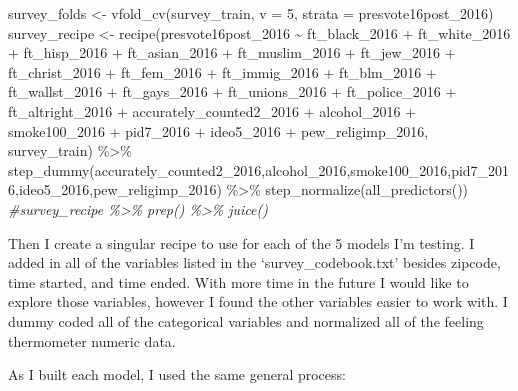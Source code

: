 \documentclass[
]{article}
\newenvironment{Shaded}{\begin{snugshade}}{\end{snugshade}}
\newcommand{\AttributeTok}[1]{\textcolor[rgb]{0.77,0.63,0.00}{#1}}
\newcommand{\CommentTok}[1]{\textcolor[rgb]{0.56,0.35,0.01}{\textit{#1}}}
\newcommand{\DecValTok}[1]{\textcolor[rgb]{0.00,0.00,0.81}{#1}}
\newcommand{\FunctionTok}[1]{\textcolor[rgb]{0.00,0.00,0.00}{#1}}
\newcommand{\NormalTok}[1]{#1}
\newcommand{\OtherTok}[1]{\textcolor[rgb]{0.56,0.35,0.01}{#1}}
\newcommand{\SpecialCharTok}[1]{\textcolor[rgb]{0.00,0.00,0.00}{#1}}
\begin{document}
\begin{Shaded}
\begin{Highlighting}[]
\NormalTok{survey\_folds }\OtherTok{\textless{}{-}} \FunctionTok{vfold\_cv}\NormalTok{(survey\_train, }\AttributeTok{v =} \DecValTok{5}\NormalTok{, }\AttributeTok{strata =}\NormalTok{ presvote16post\_2016)}
\NormalTok{survey\_recipe }\OtherTok{\textless{}{-}} \FunctionTok{recipe}\NormalTok{(presvote16post\_2016 }\SpecialCharTok{\textasciitilde{}}\NormalTok{ ft\_black\_2016 }\SpecialCharTok{+}\NormalTok{ ft\_white\_2016 }\SpecialCharTok{+}\NormalTok{ ft\_hisp\_2016 }\SpecialCharTok{+} 
\NormalTok{                           ft\_asian\_2016 }\SpecialCharTok{+}\NormalTok{ ft\_muslim\_2016 }\SpecialCharTok{+}\NormalTok{ ft\_jew\_2016 }\SpecialCharTok{+}\NormalTok{ ft\_christ\_2016 }\SpecialCharTok{+}\NormalTok{ ft\_fem\_2016 }\SpecialCharTok{+}
\NormalTok{                          ft\_immig\_2016 }\SpecialCharTok{+}\NormalTok{ ft\_blm\_2016 }\SpecialCharTok{+}\NormalTok{ ft\_wallst\_2016 }\SpecialCharTok{+}\NormalTok{ ft\_gays\_2016 }\SpecialCharTok{+}\NormalTok{ ft\_unions\_2016 }\SpecialCharTok{+}
\NormalTok{                          ft\_police\_2016 }\SpecialCharTok{+}\NormalTok{ ft\_altright\_2016 }\SpecialCharTok{+}\NormalTok{ accurately\_counted2\_2016 }\SpecialCharTok{+}\NormalTok{ alcohol\_2016 }\SpecialCharTok{+} 
\NormalTok{                          smoke100\_2016 }\SpecialCharTok{+}\NormalTok{ pid7\_2016 }\SpecialCharTok{+}\NormalTok{ ideo5\_2016 }\SpecialCharTok{+}\NormalTok{ pew\_religimp\_2016, survey\_train) }\SpecialCharTok{\%\textgreater{}\%} 
  \FunctionTok{step\_dummy}\NormalTok{(accurately\_counted2\_2016,alcohol\_2016,smoke100\_2016,pid7\_2016,ideo5\_2016,pew\_religimp\_2016) }\SpecialCharTok{\%\textgreater{}\%} 
  \FunctionTok{step\_normalize}\NormalTok{(}\FunctionTok{all\_predictors}\NormalTok{())}
\CommentTok{\#survey\_recipe \%\textgreater{}\% prep() \%\textgreater{}\% juice()}
\end{Highlighting}
\end{Shaded}

Then I create a singular recipe to use for each of the 5 models I'm
testing. I added in all of the variables listed in the
`survey\_codebook.txt' besides zipcode, time started, and time ended.
With more time in the future I would like to explore those variables,
however I found the other variables easier to work with. I dummy coded
all of the categorical variables and normalized all of the feeling
thermometer numeric data.

As I built each model, I used the same general process:
\end{document}
